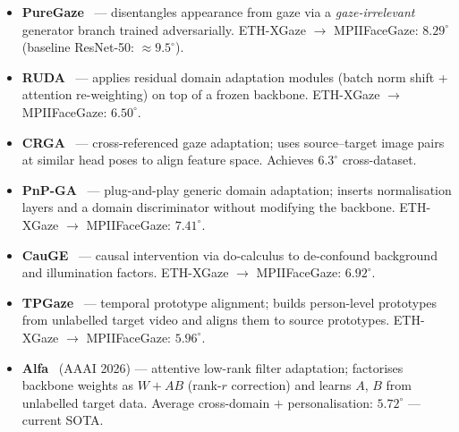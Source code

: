 \documentclass[11pt,a4paper]{article}
\begin{document}
\begin{itemize}
  \item \textbf{PureGaze}~\cite{cheng2022puregaze} --- disentangles appearance from gaze via
        a \emph{gaze-irrelevant} generator branch trained adversarially.
        ETH-XGaze $\to$ MPIIFaceGaze: $8.29^\circ$ (baseline ResNet-50: $\approx9.5^\circ$).

  \item \textbf{RUDA}~\cite{bao2022ruda} --- applies residual domain adaptation modules (batch norm shift
        + attention re-weighting) on top of a frozen backbone.
        ETH-XGaze $\to$ MPIIFaceGaze: $6.50^\circ$.

  \item \textbf{CRGA}~\cite{li2022crga} --- cross-referenced gaze adaptation; uses source--target
        image pairs at similar head poses to align feature space.
        Achieves $6.3^\circ$ cross-dataset.

  \item \textbf{PnP-GA}~\cite{liu2021pnpga} --- plug-and-play generic domain adaptation; inserts
        normalisation layers and a domain discriminator without modifying the backbone.
        ETH-XGaze $\to$ MPIIFaceGaze: $7.41^\circ$.

  \item \textbf{CauGE}~\cite{wang2022cauge} --- causal intervention via do-calculus to de-confound
        background and illumination factors.
        ETH-XGaze $\to$ MPIIFaceGaze: $6.92^\circ$.

  \item \textbf{TPGaze}~\cite{cai2023tpgaze} --- temporal prototype alignment; builds person-level
        prototypes from unlabelled target video and aligns them to source prototypes.
        ETH-XGaze $\to$ MPIIFaceGaze: $5.96^\circ$.

  \item \textbf{Alfa}~\cite{qin2024alfa} (AAAI 2026) --- attentive low-rank filter adaptation;
        factorises backbone weights as $W + AB$ (rank-$r$ correction) and learns $A$, $B$
        from unlabelled target data.
        Average cross-domain $+$ personalisation: $\mathbf{5.72^\circ}$ --- current SOTA.
\end{itemize}
\end{document}
